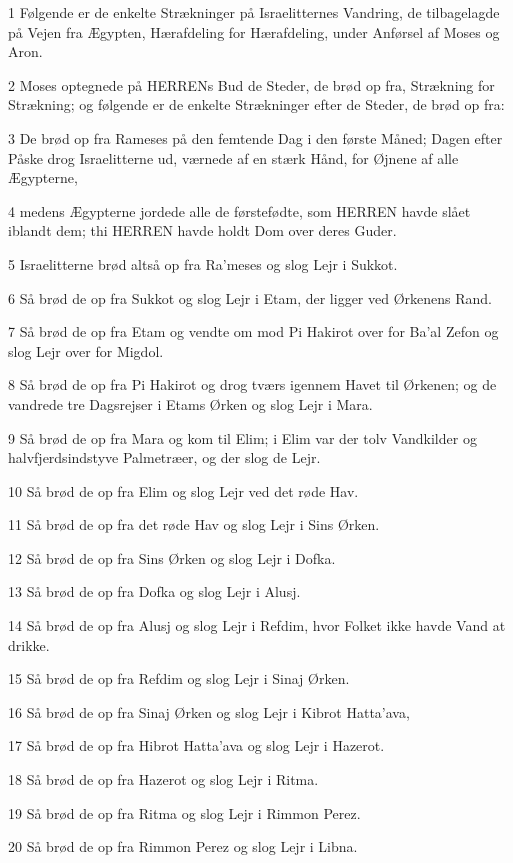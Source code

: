 \par 1 Følgende er de enkelte Strækninger på Israelitternes Vandring, de tilbagelagde på Vejen fra Ægypten, Hærafdeling for Hærafdeling, under Anførsel af Moses og Aron.
\par 2 Moses optegnede på HERRENs Bud de Steder, de brød op fra, Strækning for Strækning; og følgende er de enkelte Strækninger efter de Steder, de brød op fra:
\par 3 De brød op fra Rameses på den femtende Dag i den første Måned; Dagen efter Påske drog Israelitterne ud, værnede af en stærk Hånd, for Øjnene af alle Ægypterne,
\par 4 medens Ægypterne jordede alle de førstefødte, som HERREN havde slået iblandt dem; thi HERREN havde holdt Dom over deres Guder.
\par 5 Israelitterne brød altså op fra Ra'meses og slog Lejr i Sukkot.
\par 6 Så brød de op fra Sukkot og slog Lejr i Etam, der ligger ved Ørkenens Rand.
\par 7 Så brød de op fra Etam og vendte om mod Pi Hakirot over for Ba'al Zefon og slog Lejr over for Migdol.
\par 8 Så brød de op fra Pi Hakirot og drog tværs igennem Havet til Ørkenen; og de vandrede tre Dagsrejser i Etams Ørken og slog Lejr i Mara.
\par 9 Så brød de op fra Mara og kom til Elim; i Elim var der tolv Vandkilder og halvfjerdsindstyve Palmetræer, og der slog de Lejr.
\par 10 Så brød de op fra Elim og slog Lejr ved det røde Hav.
\par 11 Så brød de op fra det røde Hav og slog Lejr i Sins Ørken.
\par 12 Så brød de op fra Sins Ørken og slog Lejr i Dofka.
\par 13 Så brød de op fra Dofka og slog Lejr i Alusj.
\par 14 Så brød de op fra Alusj og slog Lejr i Refdim, hvor Folket ikke havde Vand at drikke.
\par 15 Så brød de op fra Refdim og slog Lejr i Sinaj Ørken.
\par 16 Så brød de op fra Sinaj Ørken og slog Lejr i Kibrot Hatta'ava,
\par 17 Så brød de op fra Hibrot Hatta'ava og slog Lejr i Hazerot.
\par 18 Så brød de op fra Hazerot og slog Lejr i Ritma.
\par 19 Så brød de op fra Ritma og slog Lejr i Rimmon Perez.
\par 20 Så brød de op fra Rimmon Perez og slog Lejr i Libna.

